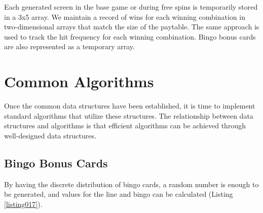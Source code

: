 \documentclass[12pt,twoside,openany]{book}
\begin{document}
Each generated screen in the base game or during free spins is temporarily stored in a 3x5 array. We maintain a record of wins for each winning combination in two-dimensional arrays that match the size of the paytable. The same approach is used to track the hit frequency for each winning combination. Bingo bonus cards are also represented as a temporary array.

\chapter{Common Algorithms}

Once the common data structures have been established, it is time to implement standard algorithms that utilize these structures. The relationship between data structures and algorithms is that efficient algorithms can be achieved through well-designed data structures.

\section*{Bingo Bonus Cards}

By having the discrete distribution of bingo cards, a random number is enough to be generated, and values for the line and bingo can be calculated (Listing \ref{listing017}).
\end{document}

